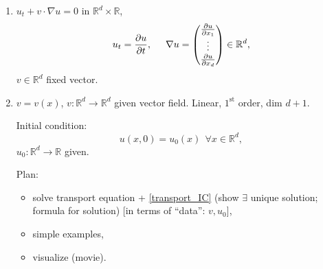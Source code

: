 \documentclass[12pt]{article}
\theoremstyle{definition}
\begin{document}
\begin{enumerate}[label=\alph*)]
\item\label{transport} $u_t+v\cdot\nabla u=0$ in $\mathbb R^d\times\mathbb R$,
\[u_t=\frac{\partial u}{\partial t},\hspace{5mm}\nabla u=\left(\begin{matrix}\frac{\partial u}{\partial x_1}\\\vdots\\\frac{\partial u}{\partial x_d}\end{matrix}\right)\in\mathbb R^d,\]
$v\in\mathbb R^d$ fixed vector.

\item $v=v(x)$, $v:\mathbb R^d\rightarrow\mathbb R^d$ given vector field. Linear, $1^\text{st}$ order, dim $d+1$.

Initial condition:
\begin{equation}\tag{IC}\label{transport_IC}
u(x,0)=u_0(x)\ \ \forall x\in\mathbb R^d,
\end{equation}
$u_0:\mathbb R^d\rightarrow\mathbb R$ given.

Plan:
\begin{itemize}
\item solve transport equation + \eqref{transport_IC} (show $\exists$ unique solution; formula for solution) [in terms of ``data'': $v,u_0$],
\item simple examples,
\item visualize (movie).
\end{itemize}
\end{enumerate}
\end{document}
